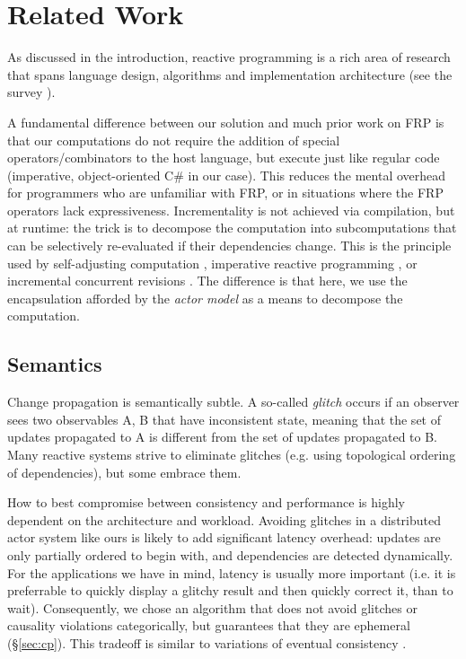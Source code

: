 \section{Related Work}

As discussed in the introduction, reactive programming is a rich area of research that spans language design, algorithms and implementation architecture (see the survey \cite{reactivesurvey}).

A fundamental difference between our solution and much prior work on FRP \cite{frp-firstprinciples,frp-animation,frp-frtime,frp-arrows,elm,afp,flapjax,frappe} is that our computations do not require the addition of special operators/combinators to the host language, but execute just like regular code (imperative, object-oriented C\# in our case). This reduces the mental overhead for programmers who are unfamiliar with FRP, or in situations where the FRP operators lack expressiveness. Incrementality is not achieved via compilation, but at runtime: the trick is to decompose the computation into subcomputations that can be selectively re-evaluated if their dependencies change. This is the principle used by self-adjusting computation \cite{acar-ahmed-blume-POPL08,Acar:SelfAdjustingExperiments,Acar:SelfAdjustingOverview,Hammer:Ceal09,Acar:SelfAdjustingTypes10}, imperative reactive programming \cite{camil}, or incremental concurrent revisions \cite{burckhardt-leijen-yi-sadowski-ball-OOPSLA11}. The difference is that here, we use the encapsulation afforded by the \emph{actor model} as a means to decompose the computation.

\subsection{Semantics}

Change propagation is semantically subtle. A so-called \emph{glitch} occurs if an observer sees two observables A, B that have inconsistent state, meaning that the set of updates propagated to A is different from the set of updates propagated to B. Many reactive systems strive to eliminate glitches (e.g. using topological ordering of dependencies), but some embrace them.

How to best compromise between consistency and performance is highly dependent on the architecture and workload. Avoiding glitches in a distributed actor system like ours is likely to add significant latency overhead: updates are only partially ordered to begin with, and dependencies are detected dynamically. For the applications we have in mind, latency is usually more important (i.e. it is preferrable to quickly display a glitchy result and then quickly correct it, than to wait). Consequently, we chose an algorithm that does not avoid glitches or causality violations categorically, but guarantees that they are ephemeral (\S\ref{sec:cp}). This tradeoff is similar to variations of eventual consistency \cite{principles}.
 
